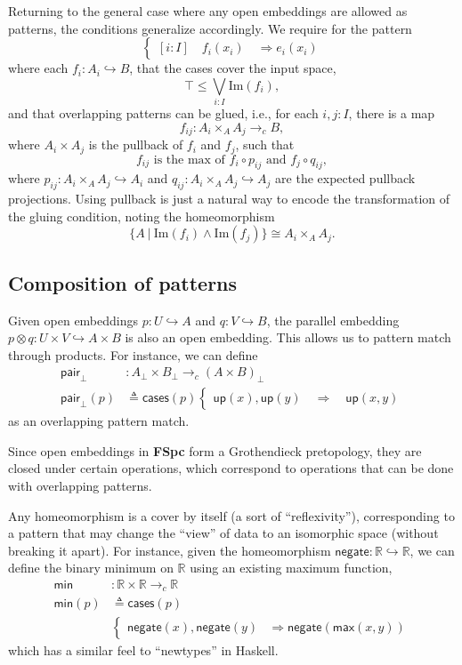 \documentclass[conference]{IEEEtran}
\newcommand{\hookto}{\hookrightarrow}
\newcommand{\cto}{\to_c}
\newcommand{\R}{\mathbb{R}}
\newcommand{\suchthat}{\ |\ }
\newcommand{\Img}[1]{\text{Im}\left({#1}\right)}
\newcommand{\negate}{\mathsf{negate}}
\newcommand{\Branch}{\Rightarrow}
\newcommand{\up}{\mathsf{up}}
\newcommand{\isthemaxof}[3]{{#1}\text{ is the max of }{#2}\text{ and }{#3}}
\begin{document}
Returning to the general case where any open embeddings are allowed as patterns, the conditions generalize accordingly. We require for the pattern
\[
\begin{cases}
[i : I] \quad f_i(x_i) \quad \Branch e_i(x_i)
\end{cases}
\]
where each $f_i : A_i \hookto B$, that the cases cover the input space,
\[
\top \le \bigvee_{i : I} \Img{f_i},
\]
and that overlapping patterns can be glued, i.e., for each $i, j : I$, there is a map
\[
f_{ij} : A_i \times_A A_j \cto B,
\]
where $A_i \times A_j$ is the pullback of $f_i$ and $f_j$, such that 
\[
\isthemaxof{ f_{ij} }{ f_i \circ p_{ij}}{ f_j \circ q_{ij}},
\]
where $p_{ij} : A_i \times_A A_j \hookto A_i$ and $q_{ij} : A_i \times_A A_j \hookto A_j$ are the expected pullback projections. Using pullback is just a natural way to encode the transformation of the gluing condition, noting the homeomorphism
\[
 \{A \suchthat \Img{f_i} \wedge \Img{f_j} \} \cong A_i \times_A A_j.
\]

\subsection{Composition of patterns}

Given open embeddings $p : U \hookto A$ and $q : V \hookto B$, the parallel embedding $p \otimes q : U \times V \hookto A \times B$ is also an open embedding. This allows us to pattern match through products. 
For instance, we can define
\begin{align*}
 \mathsf{pair}_\bot &: A_\bot \times B_\bot \cto \left( A \times B \right)_\bot
\\ \mathsf{pair}_\bot(p) &\triangleq \mathsf{cases}(p)
\begin{cases}
\up(x) , \up(y)
  \quad \Branch \quad \up(x, y)
\end{cases}
\end{align*}
as an overlapping pattern match.

Since open embeddings in \textbf{FSpc} form a Grothendieck pretopology, they are closed under certain operations, which correspond to operations that can be done with overlapping patterns.

Any homeomorphism is a cover by itself (a sort of ``reflexivity''), corresponding to a pattern that may change the ``view'' of data to an isomorphic space (without breaking it apart). For instance, given the homeomorphism $\negate : \R \hookto \R$, we can define the binary minimum on $\R$ using an existing maximum function,
\begin{align*}
\mathsf{min} &: \R \times \R \cto \R
\\ \mathsf{min}(p) &\triangleq \mathsf{cases}(p)
\\ &\begin{cases}
\negate(x), \negate(y) &\Branch \negate(\mathsf{max}(x, y))
\end{cases}
\end{align*}
which has a similar feel to ``newtypes'' in Haskell.
\end{document}
